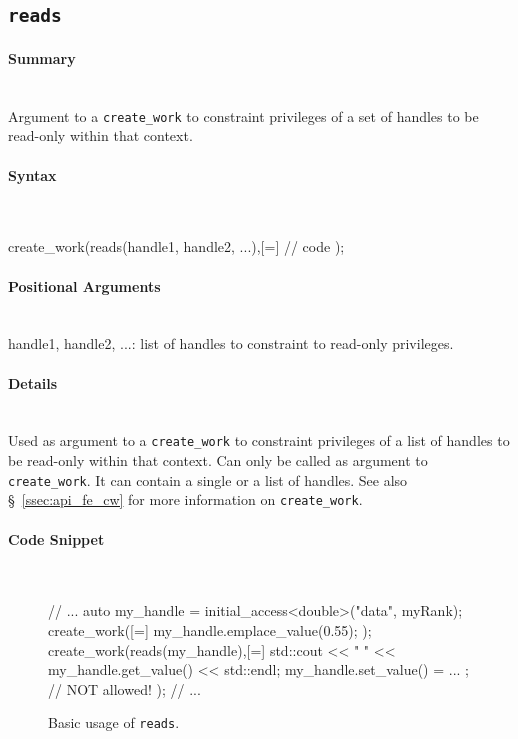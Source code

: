 \subsection{\texttt{reads}}
\label{ssec:api_fe_reads}

\paragraph{Summary} \mbox{}\\
Argument to a \texttt{create\_work} to constraint 
privileges of a set of handles to be read-only within that context.

\paragraph{Syntax} \mbox{}\\
\begin{CppCode}
create_work(reads(handle1, handle2, ...),[=]{
	// code 
});
\end{CppCode}

\paragraph{Positional Arguments} \mbox{}\\
handle1, handle2, ...: list of handles to 
constraint to read-only privileges.

\paragraph{Details} \mbox{}\\
Used as argument to a \texttt{create\_work} to constraint 
privileges of a list of handles to be read-only within that context.
Can only be called as argument to \texttt{create\_work}. 
It can contain a single or a list of handles. 
See also \S~\ref{ssec:api_fe_cw} for more information on \texttt{create\_work}.


\paragraph{Code Snippet} \mbox{}\\
\begin{figure}[!h]
\begin{CppCodeNumb}
// ...
auto my_handle = initial_access<double>("data", myRank);
create_work([=]{
  my_handle.emplace_value(0.55);
});
create_work(reads(my_handle),[=]{
  std::cout << " " << my_handle.get_value() << std::endl;
  my_handle.set_value() = ... ; // NOT allowed!
});
// ... 
\end{CppCodeNumb}
\label{fig:fe_api_reads}
\caption{Basic usage of \texttt{reads}.}
\end{figure}


